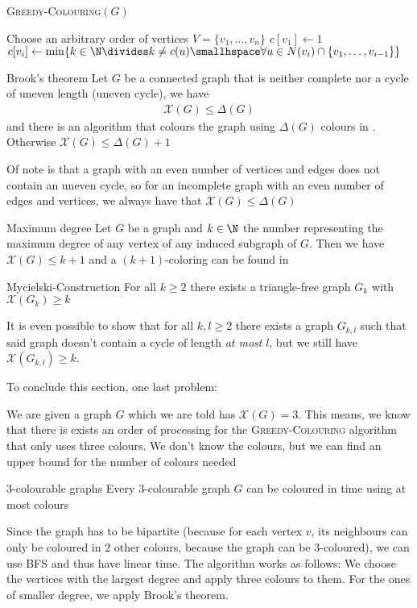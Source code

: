 \begin{algorithm}
    \caption{\textsc{Greedy-Colouring}$(G)$}
    \begin{algorithmic}[1]
        \State Choose an arbitrary order of vertices $V = \{v_1, \ldots, v_n\}$
        \State $c[v_1] \gets 1$
            \State $c[v_i] \gets \min \{k \in \N \divides k \neq c(u) \smallhspace \forall u \in N(v_i) \cap \{v_1, \ldots, v_{i - 1}\}\}$ 
        \EndFor
    \end{algorithmic}
\end{algorithm}

\begin{theorem}[]{Brook's theorem}
    Let $G$ be a connected graph that is neither complete nor a cycle of uneven length (uneven cycle), we have
    \begin{align*}
        \mathscr{X}(G) \leq \Delta(G)
    \end{align*}
    and there is an algorithm that colours the graph using $\Delta(G)$ colours in . Otherwise $\mathscr{X}(G) \leq \Delta(G) + 1$
\end{theorem}
Of note is that a graph with an even number of vertices and edges does not contain an uneven cycle, so for an incomplete graph with an even number of edges and vertices, we always have that $\mathscr{X}(G) \leq \Delta(G)$

\begin{theorem}[]{Maximum degree}
    Let $G$ be a graph and $k \in \N$ the number representing the maximum degree of any vertex of any induced subgraph of $G$. Then we have $\mathscr{X}(G) \leq k + 1$ and a $(k + 1)$-coloring can be found in 
\end{theorem}

\begin{theorem}[]{Mycielski-Construction}
    For all $k \geq 2$ there exists a triangle-free graph $G_k$ with $\mathscr{X}(G_k) \geq k$
\end{theorem}
It is even possible to show that for all $k, l \geq 2$ there exists a graph $G_{k, l}$ such that said graph doesn't contain a cycle of length \textit{at most} $l$, but we still have $\mathscr{X}(G_{k, l}) \geq k$.

To conclude this section, one last problem:

We are given a graph $G$ which we are told has $\mathscr{X}(G) = 3$. This means, we know that there is exists an order of processing for the \textsc{Greedy-Colouring} algorithm that only uses three colours. We don't know the colours, but we can find an upper bound for the number of colours needed
\begin{theorem}[]{$3$-colourable graphs}
    Every $3$-colourable graph $G$ can be coloured in time  using at most  colours
\end{theorem}
Since the graph has to be bipartite (because for each vertex $v$, its neighbours can only be coloured in $2$ other colours, because the graph can be $3$-coloured), we can use BFS and thus have linear time. The algorithm works as follows: We choose the vertices with the largest degree and apply three colours to them. For the ones of smaller degree, we apply Brook's theorem.

